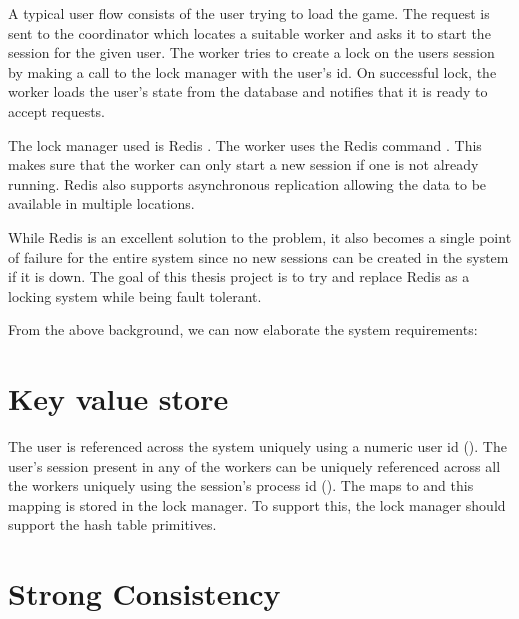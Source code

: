 A typical user flow consists of the user trying to load the game. The request
is sent to the coordinator which locates a suitable worker and asks it to
start the session for the given user. The worker tries to create a lock on
the users session by making a call to the lock manager with the user's id.
On successful lock, the worker loads the user's state from the database and
notifies that it is ready to accept requests.

The lock manager used is Redis \citep{redis}%
. The worker uses the Redis command %
. This makes sure that the worker can only start a new session if one is
not already running. Redis also supports asynchronous replication allowing the
data to be available in multiple locations.

While Redis is an excellent solution to the problem, it also becomes a single
point of failure for the entire system since no new sessions can be created in
the system if it is down. The goal of this thesis project is to try and replace
Redis as a locking system while being fault tolerant.

From the above background, we can now elaborate the system requirements:

\section{Key value store}
\label{section:ml.kv.store}


The user is referenced across the system uniquely using a numeric user id
(). The user's session present in any of the workers can be uniquely 
referenced across all the workers uniquely using the session's process id
().
The  maps to  and this mapping is stored in the lock
manager. To support this, the lock manager should support the hash
table primitives.

\section{Strong Consistency}


